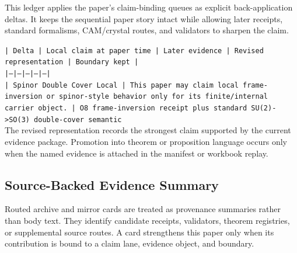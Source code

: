 \documentclass[11pt]{article}
\begin{document}
This ledger applies the paper's claim-binding queues as explicit back-application
deltas. It keeps the sequential paper story intact while allowing later
receipts, standard formalisms, CAM/crystal routes, and validators to sharpen the
claim.

\noindent\texttt{| Delta | Local claim at paper time | Later evidence | Revised representation | Boundary kept |}\\
\noindent\texttt{|---|---|---|---|---|}\\
\noindent\texttt{| Spinor Double Cover Local | This paper may claim local frame-inversion or spinor-style behavior only for its finite/internal carrier object. | O8 frame-inversion receipt plus standard SU(2)->SO(3) double-cover semantic}\\

The revised representation records the strongest claim supported by the current evidence package. Promotion into theorem or proposition language occurs only when the named evidence is attached in the manifest or workbook replay.

\subsection*{Source-Backed Evidence Summary}

Routed archive and mirror cards are treated as provenance summaries rather than
body text. They identify candidate receipts, validators, theorem registries, or
supplemental source routes. A card strengthens this paper only when its
contribution is bound to a claim lane, evidence object, and boundary.
\end{document}
